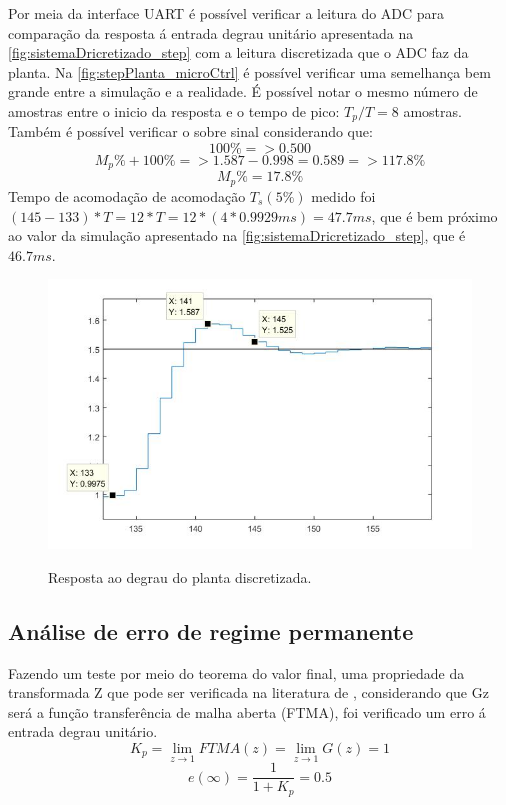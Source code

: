 \documentclass[
	article,			%
	11pt,				%
	oneside,			%
	a4paper,			%
	english,			%
	brazil,				%
	sumario=tradicional
	]{abntex2}
\begin{document}
\pagebreak

Por meia da interface UART é possível verificar a leitura do ADC para comparação da resposta á entrada degrau unitário apresentada na \autoref{fig:sistemaDricretizado_step} com a leitura discretizada que o ADC faz da planta. 
Na \autoref{fig:stepPlanta_microCtrl} é possível verificar uma semelhança bem grande entre a simulação e a realidade.
É possível notar o mesmo número de amostras entre o inicio da resposta e o tempo de pico: $T_p/T=8$ amostras.
Também é possível verificar o sobre sinal considerando que:
$$
	100\% => 0.500
$$
$$
	M_p\% + 100\%=> 1.587 - 0.998 = 0.589 => 117.8\%
$$
$$
	M_p\% = 17.8\%
$$
Tempo de acomodação de acomodação $T_s (5\%)$ medido foi $(145 - 133)*T = 12*T = 12*(4*0.9929 ms)= 47.7 ms$, que é bem próximo ao valor da simulação apresentado na \autoref{fig:sistemaDricretizado_step}, que é $46.7 ms$.

\begin{figure}[htb!]
	\centering
	\caption{Resposta ao degrau do planta discretizada.}
	\includegraphics[scale=0.7]{./img/stepPlanta_microCtrl.JPG}
	\label{fig:stepPlanta_microCtrl}
\end{figure}

\pagebreak

\subsection{Análise de erro de regime permanente}

Fazendo um teste por meio do teorema do valor final, uma propriedade da transformada Z que pode ser verificada na literatura de , considerando que Gz será a função transferência de malha aberta (FTMA), foi verificado um erro á entrada degrau unitário.
$$K_p = \lim_{z\to1} FTMA(z) = \lim_{z\to1} G(z) = 1$$ 
$$e(\infty) = \frac{1}{1+K_p} = 0.5$$
\end{document}
